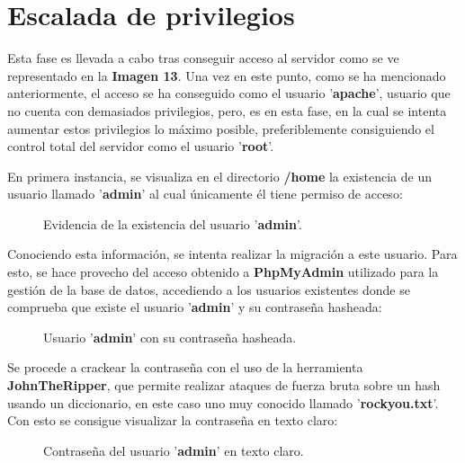 \documentclass[a4paper]{article} %
\begin{document}
  \section{Escalada de privilegios}
    Esta fase es llevada a cabo tras conseguir acceso al servidor como se ve representado en la \textbf{Imagen 13}. Una vez en este punto, como se ha mencionado anteriormente, el acceso se ha conseguido como el usuario '\textbf{apache}', usuario que no cuenta con demasiados privilegios, pero, es en esta fase, en la cual se intenta aumentar estos privilegios lo máximo posible, preferiblemente consiguiendo el control total del servidor como el usuario '\textbf{root}'.

    En primera instancia, se visualiza en el directorio \textbf{/home} la existencia de un usuario llamado '\textbf{admin}' al cual únicamente él tiene permiso de acceso:

    \begin{figure}[h]
    \centering
    \setlength{\fboxrule}{0.8pt}
      \caption{Evidencia de la existencia del usuario '\textbf{admin}'.}
  \end{figure}

  Conociendo esta información, se intenta realizar la migración a este usuario. Para esto, se hace provecho del acceso obtenido a \textbf{PhpMyAdmin} utilizado para la gestión de la base de datos, accediendo a los usuarios existentes donde se comprueba que existe el usuario '\textbf{admin}' y su contraseña hasheada:

  \begin{figure}[h]
    \centering
    \setlength{\fboxrule}{0.8pt}
    \caption{Usuario '\textbf{admin}' con su contraseña hasheada.}
  \end{figure}

  \clearpage

  Se procede a crackear la contraseña con el uso de la herramienta \textbf{JohnTheRipper}, que permite realizar ataques de fuerza bruta sobre un hash usando un diccionario, en este caso uno muy conocido llamado '\textbf{rockyou.txt}'. Con esto se consigue visualizar la contraseña en texto claro:

 \begin{figure}[h]
    \centering
    \setlength{\fboxrule}{0.8pt}
    \caption{Contraseña del usuario '\textbf{admin}' en texto claro.}
 \end{figure}
\end{document}
